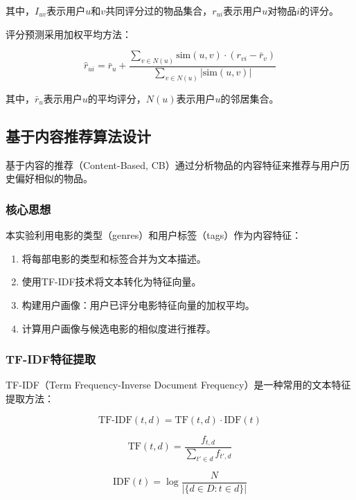 \documentclass[a4paper]{article}
\begin{document}
其中，$I_{uv}$表示用户$u$和$v$共同评分过的物品集合，$r_{ui}$表示用户$u$对物品$i$的评分。

评分预测采用加权平均方法：

\begin{equation}
\hat{r}_{ui} = \bar{r}_u + \frac{\sum_{v \in N(u)} \text{sim}(u, v) \cdot (r_{vi} - \bar{r}_v)}{\sum_{v \in N(u)} |\text{sim}(u, v)|}
\end{equation}

其中，$\bar{r}_u$表示用户$u$的平均评分，$N(u)$表示用户$u$的邻居集合。

\subsection{基于内容推荐算法设计}

基于内容的推荐（Content-Based, CB）通过分析物品的内容特征来推荐与用户历史偏好相似的物品。

\subsubsection{核心思想}

本实验利用电影的类型（genres）和用户标签（tags）作为内容特征：
\begin{enumerate}
    \item 将每部电影的类型和标签合并为文本描述。
    \item 使用TF-IDF技术将文本转化为特征向量。
    \item 构建用户画像：用户已评分电影特征向量的加权平均。
    \item 计算用户画像与候选电影的相似度进行推荐。
\end{enumerate}

\subsubsection{TF-IDF特征提取}

TF-IDF（Term Frequency-Inverse Document Frequency）是一种常用的文本特征提取方法：

\begin{equation}
\text{TF-IDF}(t, d) = \text{TF}(t, d) \cdot \text{IDF}(t)
\end{equation}

\begin{equation}
\text{TF}(t, d) = \frac{f_{t,d}}{\sum_{t' \in d} f_{t',d}}
\end{equation}

\begin{equation}
\text{IDF}(t) = \log \frac{N}{|\{d \in D : t \in d\}|}
\end{equation}
\end{document}
